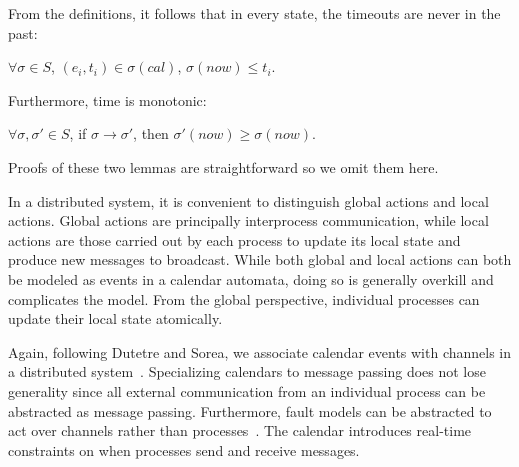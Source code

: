 \documentclass{llncs/llncs}
\begin{document}
From the definitions, it follows that in every state, the timeouts are never in the past:
\begin{lemma}\label{lem:ft}
$\forall \sigma \in S$, $(e_i, t_i) \in \sigma(cal)$, $\sigma(now) \leq t_i$.
\end{lemma}

\noindent
Furthermore, time is monotonic:
\begin{lemma}
$\forall \sigma, \sigma' \in S$, if $\sigma \rightarrow \sigma'$, then $\sigma'(now) \geq \sigma(now)$.
\end{lemma}

Proofs of these two lemmas are straightforward so we omit them here.

In a distributed system, it is convenient to distinguish global actions and local actions. Global actions are principally interprocess communication, while local actions are those carried out by each process to update its local state and produce new messages to broadcast. While both global and local actions can both be modeled as events in a calendar automata, doing so is generally overkill and complicates the model. From the global perspective, individual processes can update their local state atomically.

Again, following Dutetre and Sorea, we associate calendar events with channels in a distributed system~\cite{dutetre}. Specializing calendars to message passing does not lose generality since all external communication from an individual process can be abstracted as message passing. Furthermore, fault models can be abstracted to act over channels rather than processes~\cite{abstractions}. The calendar introduces real-time constraints on when processes send and receive messages.
\end{document}
